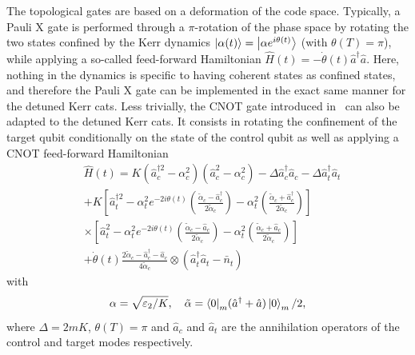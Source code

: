 \documentclass[%
 reprint,
 superscriptaddress,
 amsmath,
 amssymb,
 aps,
 pra,
 10pt
]{revtex4-2}
\newcommand{\nbar}{\bar{n}}
\newcommand{\adag}{\hat{a}^\dagger}
\newcommand{\adagsq}{\hat{a}^{\dagger 2}}
\newcommand{\hata}{\hat{a}}
\begin{document}
The topological gates are based on a deformation of the code space. Typically,  a Pauli X gate is performed through a $\pi$-rotation of the phase space by rotating the two states confined by the Kerr dynamics $\ket{\alpha(t)} = \ket{\alpha e^{i \theta(t)}}$ (with $\theta(T)=\pi$), while applying a so-called feed-forward Hamiltonian ${\hat H(t)=-\dot\theta(t) \hat a^\dagger \hat a}$. Here, nothing in the dynamics is specific to having coherent states as confined states, and therefore the Pauli X gate can be implemented in the exact same manner for the detuned Kerr cats. Less trivially, the CNOT gate introduced in~\cite{Puri2020} can also be adapted to the detuned Kerr cats. It consists in rotating the confinement of the target qubit conditionally on the state of the control qubit as well as applying a CNOT feed-forward Hamiltonian
\begin{equation}
    \begin{split}
        &\hat H(t) = K(\adagsq_c - \alpha_c^2)(\hata^2_c - \alpha_c^2) - \Delta \adag_c \hata_c - \Delta \adag_t \hata_t \\
        &+ K\left[\adagsq_t - \alpha^2_t e^{-2 i \theta(t)} \left(\frac{\tilde{\alpha}_c - \adag_c}{2\tilde \alpha_c}\right) - \alpha_t^2 \left(\frac{\tilde{\alpha}_c + \adag_c}{2\tilde\alpha_c}\right) \right] \\ 
        &\times \left[\hata^2_t  - \alpha^2_t e^{-2 i \theta(t)} \left(\frac{\tilde{\alpha}_c - \hata_c}{2\tilde\alpha_c}\right) - \alpha_t^2 \left(\frac{\tilde{\alpha}_c + \hata_c}{2\tilde\alpha_c}\right) \right] \\
        &+ \dot\theta(t) \frac{2 \tilde{\alpha}_c - \adag_c - \hata_c}{4 \tilde\alpha_c} \otimes (\adag_t \hata_t - \nbar_t) 
        \label{eq:cnot-drive}
    \end{split}
\end{equation}
with
\begin{equation}
        \alpha = \sqrt{\varepsilon_2/K}, \quad
        \tilde{\alpha} = {\bra{0}}_m(\adag+\hata)\ket{0}_m/2,
\end{equation}
where $\Delta=2mK$, $\theta(T) = \pi$ and $\hata_c$ and $\hata_t$ are the annihilation operators of the control and target modes respectively. 
\end{document}
